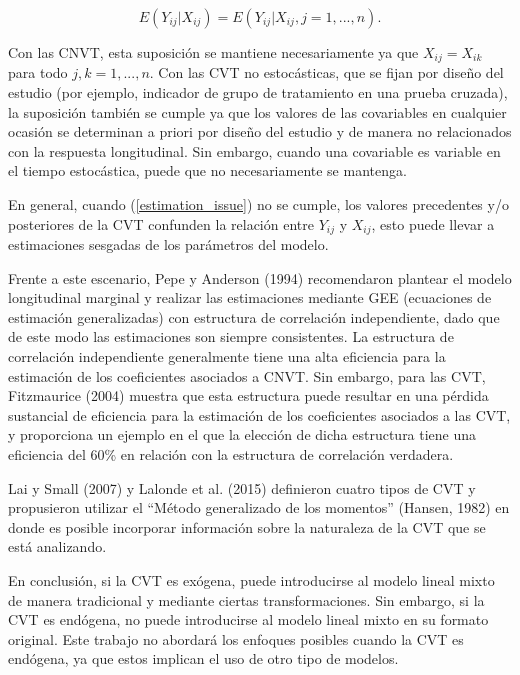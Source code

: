 \documentclass[spanish]{article}
\numberwithin{figure}{subsection}
\numberwithin{equation}{subsection}
\numberwithin{table}{subsection}
\begin{document}
\begin{equation}
\label{estimation_issue}
	E(Y_{ij} | X_{ij}) = E(Y_{ij} | X_{ij}, j = 1, ..., n).
\end{equation}

Con las CNVT, esta suposición se mantiene necesariamente ya que $X_{ij} =
X_{ik}$ para todo $j, k = 1, ..., n$. Con las CVT no estocásticas, que se fijan
por diseño del estudio (por ejemplo, indicador de grupo de tratamiento en una
prueba cruzada), la suposición también se cumple ya que los valores de las
covariables en cualquier ocasión se determinan a priori por diseño del estudio y
de manera no relacionados con la respuesta longitudinal. Sin embargo, cuando una
covariable es variable en el tiempo estocástica, puede que no necesariamente se
mantenga.

En general, cuando (\ref{estimation_issue}) no se cumple, los valores
precedentes y/o posteriores de la CVT confunden la relación entre $Y_{ij}$ y
$X_{ij}$, esto puede llevar a estimaciones sesgadas de los parámetros del
modelo.

Frente a este escenario, Pepe y Anderson (1994) recomendaron plantear el modelo
longitudinal marginal y realizar las estimaciones mediante GEE (ecuaciones de
estimación generalizadas) con estructura de correlación independiente, dado que
de este modo las estimaciones son siempre consistentes. La estructura de
correlación independiente generalmente tiene una alta eficiencia para la
estimación de los coeficientes asociados a CNVT. Sin embargo, para las CVT,
Fitzmaurice (2004) muestra que esta estructura puede resultar en una pérdida
sustancial de eficiencia para la estimación de los coeficientes asociados a las
CVT, y proporciona un ejemplo en el que la elección de dicha estructura tiene
una eficiencia del 60\% en relación con la estructura de correlación verdadera.

Lai y Small (2007) y Lalonde et al. (2015) definieron cuatro tipos de CVT y
propusieron utilizar el ``Método generalizado de los momentos'' (Hansen, 1982)
en donde es posible incorporar información sobre la naturaleza de la CVT que se
está analizando.

En conclusión, si la CVT es exógena, puede introducirse al modelo lineal mixto
de manera tradicional y mediante ciertas transformaciones. Sin embargo, si la
CVT es endógena, no puede introducirse al modelo lineal mixto en su formato
original. Este trabajo no abordará los enfoques posibles cuando la CVT es
endógena, ya que estos implican el uso de otro tipo de modelos.
\end{document}
